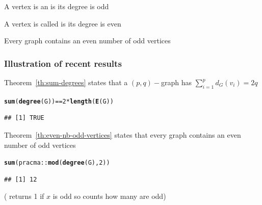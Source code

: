 \documentclass[aspectratio=169]{beamer}\usepackage[]{graphicx}\usepackage[]{xcolor}
\makeatletter
\newcommand{\hlnum}[1]{\textcolor[rgb]{0.686,0.059,0.569}{#1}}%
\newcommand{\hlopt}[1]{\textcolor[rgb]{0,0,0}{#1}}%
\newcommand{\hldef}[1]{\textcolor[rgb]{0.345,0.345,0.345}{#1}}%
\newcommand{\hlkwd}[1]{\textcolor[rgb]{0.737,0.353,0.396}{\textbf{#1}}}%
\newenvironment{kframe}{%
 \def\at@end@of@kframe{}%
 \ifinner\ifhmode%
  \def\at@end@of@kframe{\end{minipage}}%
  \begin{minipage}{\columnwidth}%
 \fi\fi%
 \def\FrameCommand##1{\hskip\@totalleftmargin \hskip-\fboxsep
 \colorbox{shadecolor}{##1}\hskip-\fboxsep
     \hskip-\linewidth \hskip-\@totalleftmargin \hskip\columnwidth}%
 \MakeFramed {\advance\hsize-\width
   \@totalleftmargin\z@ \linewidth\hsize
   \@setminipage}}%
 {\par\unskip\endMakeFramed%
 \at@end@of@kframe}
\newenvironment{knitrout}{}{} %
\makeatother
\begin{document}



\begin{frame}
\begin{definition}
A vertex is an  is its degree is odd
\end{definition}
\vfill
\begin{definition}
A vertex is called  is its degree is even
\end{definition}
\vfill
\begin{theorem}\label{th:even-nb-odd-vertices}
Every graph contains an even number of odd vertices
\end{theorem}
\end{frame}

\begin{frame}[fragile]\frametitle{Illustration of recent results}
Theorem~\ref{th:sum-degrees} states that a $(p,q)-$graph has $\sum_{i=1}^{p}d_G(v_i)=2q$
\begin{knitrout}
\color{fgcolor}\begin{kframe}
\begin{alltt}
\hlkwd{sum}\hldef{(}\hlkwd{degree}\hldef{(G))} \hlopt{==} \hlnum{2}\hlopt{*}\hlkwd{length}\hldef{(}\hlkwd{E}\hldef{(G))}
\end{alltt}
\begin{verbatim}
## [1] TRUE
\end{verbatim}
\end{kframe}
\end{knitrout}
\vfill
Theorem~\ref{th:even-nb-odd-vertices} states that every graph contains an even number of odd vertices
\begin{knitrout}
\color{fgcolor}\begin{kframe}
\begin{alltt}
\hlkwd{sum}\hldef{(pracma}\hlopt{::}\hlkwd{mod}\hldef{(}\hlkwd{degree}\hldef{(G),}\hlnum{2}\hldef{))}
\end{alltt}
\begin{verbatim}
## [1] 12
\end{verbatim}
\end{kframe}
\end{knitrout}
( returns 1 if $x$ is odd so  counts how many are odd)
\end{frame}
\end{document}
